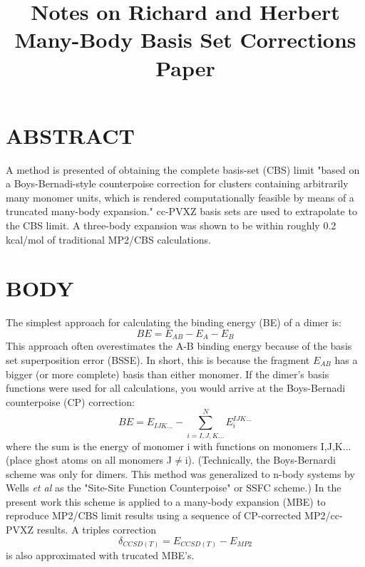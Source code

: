 \documentclass[12pt,a4paper]{article}
\title{Notes on Richard and Herbert Many-Body Basis Set Corrections Paper\cite{Richard2013}}
\begin{document}
	\maketitle
	\section{ABSTRACT}
	A method is presented of obtaining the complete basis-set (CBS) limit "based on a Boys-Bernadi-style counterpoise correction for clusters containing arbitrarily many monomer units, which is rendered computationally feasible by means of a truncated many-body expansion." cc-PVXZ basis sets are used to extrapolate to the CBS limit. A three-body expansion was shown to be within roughly 0.2 kcal/mol of traditional MP2/CBS calculations. 
	\section{BODY}
	The simplest approach for calculating the binding energy (BE) of a dimer is:
	\begin{equation} \label{eq1}
		BE = E_{AB} - E_{A} - E_{B}
	\end{equation}
	This approach often overestimates the A-B binding energy because of the basis set superposition error (BSSE). In short, this is because the fragment $E_{AB}$ has a bigger (or more complete) basis than either monomer. If the dimer's basis functions were used for all calculations, you would arrive at the Boys-Bernadi counterpoise (CP) correction:
	\begin{equation} \label{eq2}
		BE = E_{IJK...} - \sum_{i=I,J,K...}^{N}E_{i}^{IJK...}
	\end{equation}
	where the sum is the energy of monomer i with functions on monomers I,J,K... (place ghost atoms on all monomers J$\neq$i). (Technically, the Boys-Bernardi scheme was only for dimers. This method was generalized to n-body systems by Wells \textit{et al} as the "Site-Site Function Counterpoise" or SSFC scheme\cite{Wells1983}.) In the present work this scheme is applied to a many-body expansion (MBE) to reproduce MP2/CBS limit results using a sequence of CP-corrected MP2/cc-PVXZ results. A triples correction
	\begin{equation} \label{eq3}
		\delta_{CCSD(T)} = E_{CCSD(T)} - E_{MP2}
	\end{equation}
	is also approximated with trucated MBE's.
	\newpage
\end{document}

